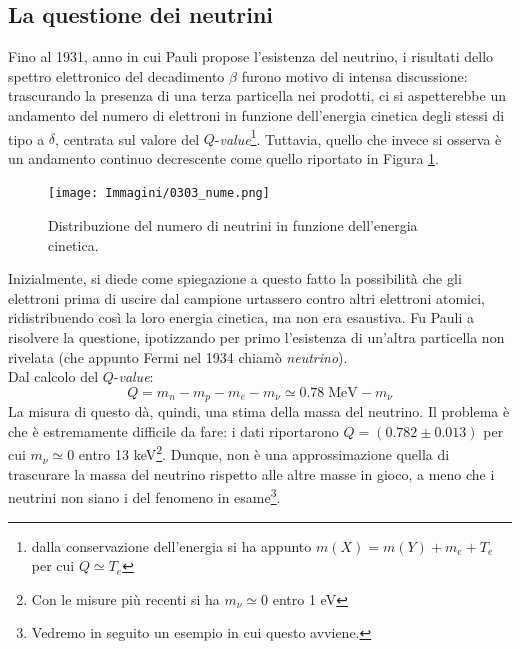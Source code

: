 \subsection{La questione dei neutrini} 
Fino al 1931, anno in cui Pauli propose l'esistenza del neutrino, i risultati dello spettro elettronico del decadimento $\beta$ furono motivo di intensa discussione: trascurando la presenza di una terza particella nei prodotti, ci si aspetterebbe un andamento del numero di elettroni in funzione dell'energia cinetica degli stessi di tipo a $\delta$, centrata sul valore del $Q$-\textit{value}\footnote{dalla conservazione dell'energia si ha appunto $m(X) = m(Y) + m_e + T_e$ per cui $Q\simeq T_e$}.
Tuttavia, quello che invece si osserva è un andamento continuo decrescente come quello riportato in Figura \ref{0303_ne}.
\begin{figure}[h]
    \centering
    \texttt{[image: Immagini/0303\_nume.png]}
    \caption{Distribuzione del numero di neutrini in funzione dell'energia cinetica.}
    \label{0303_ne}
\end{figure}
Inizialmente, si diede come spiegazione a questo fatto la possibilità che gli elettroni prima di uscire dal campione urtassero contro altri elettroni atomici, ridistribuendo così la loro energia cinetica, ma non era esaustiva. Fu Pauli a risolvere la questione, ipotizzando per primo l'esistenza di un'altra particella non rivelata (che appunto Fermi nel 1934 chiamò \textit{neutrino}).\\ Dal calcolo del $Q$-\textit{value}:
$$Q = m_n - m_p - m_e - m_\nu \simeq 0.78 \;\mbox{MeV} - m_\nu$$
La misura di questo dà, quindi, una stima della massa del neutrino. Il problema è che è estremamente difficile da fare: i dati riportarono $Q = (0.782 \pm 0.013)$ per cui $m_\nu \simeq 0$ entro 13 keV\footnote{Con le misure più recenti si ha $m_\nu \simeq 0$ entro 1 eV}. Dunque, non è una  approssimazione quella di trascurare la massa del neutrino rispetto alle altre masse in gioco, a meno che i neutrini non siano i  del fenomeno in esame\footnote{Vedremo in seguito un esempio in cui questo avviene.}. 
